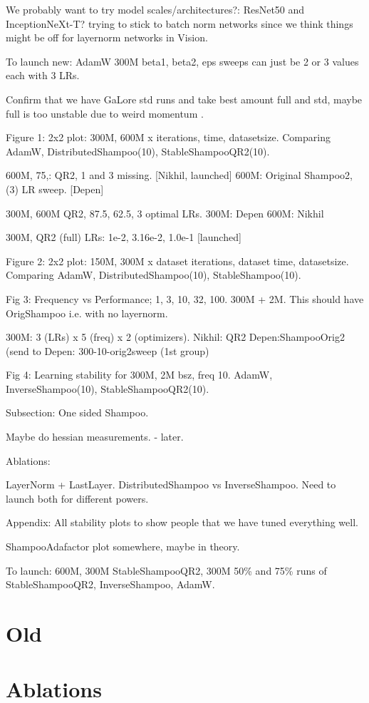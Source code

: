
{\color{blue} We probably want to try model scales/architectures?: ResNet50 and InceptionNeXt-T? trying to stick to batch norm networks since we think things might be off for layernorm networks in Vision.}

To launch new: AdamW 300M beta1, beta2, eps sweeps can just be 2 or 3 values each with 3 LRs.  

Confirm that we have GaLore std runs and take best amount full and std, maybe full is too unstable due to weird momentum .


Figure 1: 2x2 plot: 300M, 600M x iterations, time, datasetsize. Comparing AdamW, DistributedShampoo(10), StableShampooQR2(10).

600M, 75,: QR2, 1 and 3 missing. [Nikhil, launched] 
600M: Original Shampoo2, (3) LR sweep. [Depen]

300M, 600M QR2, 87.5, 62.5, 3 optimal LRs. 
300M: Depen
600M: Nikhil

300M, QR2 (full) LRs: 1e-2, 3.16e-2, 1.0e-1 [launched]


Figure 2: 2x2 plot: 150M, 300M x dataset iterations, dataset time, datasetsize. Comparing AdamW, DistributedShampoo(10), StableShampoo(10).

Fig 3: Frequency vs Performance; 1, 3, 10, 32, 100. 300M + 2M. This should have OrigShampoo i.e. with no layernorm.

300M: 3 (LRs) x 5 (freq) x 2 (optimizers).
Nikhil: QR2
Depen:ShampooOrig2 (send to Depen: 300-10-orig2sweep (1st group)



Fig 4: Learning stability for 300M, 2M bsz, freq 10.  AdamW, InverseShampoo(10), StableShampooQR2(10).

Subsection: One sided Shampoo.

Maybe do hessian measurements. - later.

Ablations:

LayerNorm + LastLayer. DistributedShampoo vs InverseShampoo. Need to launch both for different powers. 

Appendix: All stability plots to show people that we have tuned everything well.

ShampooAdafactor plot somewhere, maybe in theory.

To launch: 600M, 300M StableShampooQR2, 300M 50\% and 75\% runs of StableShampooQR2, InverseShampoo, AdamW. 








\section{Old}



\section{Ablations}
